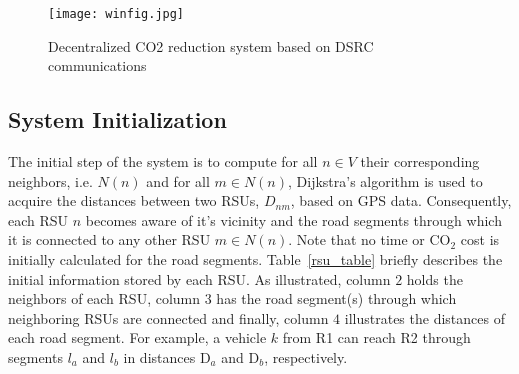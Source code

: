 \documentclass[conference]{IEEEtran}
\begin{document}
\begin{figure}[!htb]
  \centering
  \texttt{[image: winfig.jpg]}
  \caption{Decentralized CO2 reduction system based on DSRC communications}
  \label{toy_net}

\end{figure}

\subsection{System Initialization}
The initial step of the system is to compute for all $n\in V$ their corresponding neighbors, i.e. $N(n)$ and for all $m \in N(n)$, Dijkstra's algorithm is used 
to acquire the distances between two RSUs,  $D_{nm}$, based on GPS data. 
Consequently, each RSU $n$ becomes aware of it's vicinity and the road segments through which it is connected to any other RSU $m\in N(n)$. Note that no time or CO$_2$ cost is initially calculated for the road segments. Table~\ref{rsu_table} briefly describes
the initial information stored by each RSU. As illustrated, column $2$ holds the neighbors of each RSU, column $3$  has the road segment(s) through which neighboring RSUs are
connected and finally, column $4$ illustrates the distances of each road segment.  For example, a vehicle $k$ from R1 can reach R2 through segments $l_a$ and $l_b$ in distances D$_{a}$ and D$_{b}$, respectively.
\end{document}
